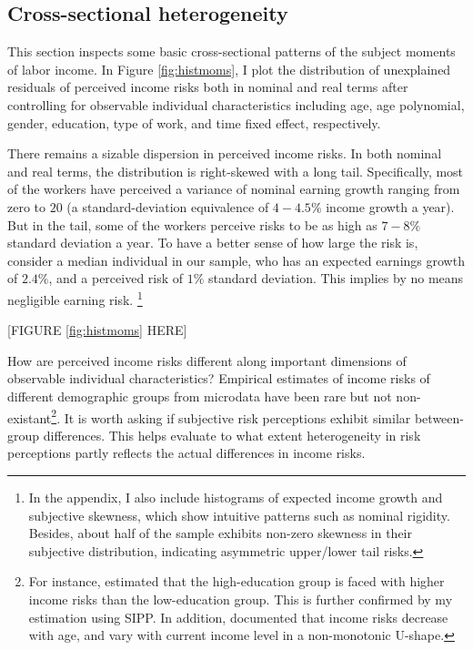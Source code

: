 
\hypertarget{cross-sectional-heterogeneity}{%
\subsection{Cross-sectional
heterogeneity}\label{cross-sectional-heterogeneity}}

This section inspects some basic cross-sectional patterns of the subject
moments of labor income. In Figure \ref{fig:histmoms}, I plot the
distribution of unexplained residuals of perceived income risks both in nominal and real terms after controlling for observable individual characteristics including age, age polynomial, gender, education, type of work, and time fixed effect, respectively.

There remains a sizable dispersion in perceived income risks. In both nominal
and real terms, the distribution is right-skewed with a long tail.
Specifically, most of the workers have perceived a variance of nominal
earning growth ranging from zero to \(20\) (a standard-deviation
equivalence of \(4-4.5\%\) income growth a year). But in the tail, some
of the workers perceive risks to be as high as \(7-8\%\) standard
deviation a year. To have a better sense of how large the risk is,
consider a median individual in our sample, who has an expected earnings
growth of \(2.4\%\), and a perceived risk of \(1\%\) standard deviation.
This implies by no means negligible earning risk.
\footnote{In the appendix, I also include histograms of expected income growth and subjective skewness, which show intuitive patterns such as nominal rigidity. Besides, about half of the sample exhibits non-zero skewness in their subjective distribution, indicating asymmetric upper/lower tail risks.}

\begin{center}
[FIGURE \ref{fig:histmoms} HERE]
\end{center}

How are perceived income risks different along important dimensions of observable individual characteristics? Empirical estimates of income risks of different demographic
groups from microdata have been rare but not non-existant\footnote{For instance, \cite{meghir2004income} estimated that the high-education group is faced with higher income risks than the low-education group.  This is further confirmed by my estimation using SIPP.  In addition, \cite{sabelhaus2010great, bloom2018great} documented that income risks decrease with age, and vary with current income level in a non-monotonic U-shape.}. It is worth asking if subjective risk perceptions exhibit similar between-group differences. This helps evaluate to what extent heterogeneity in risk perceptions partly reflects the actual differences in income risks.

